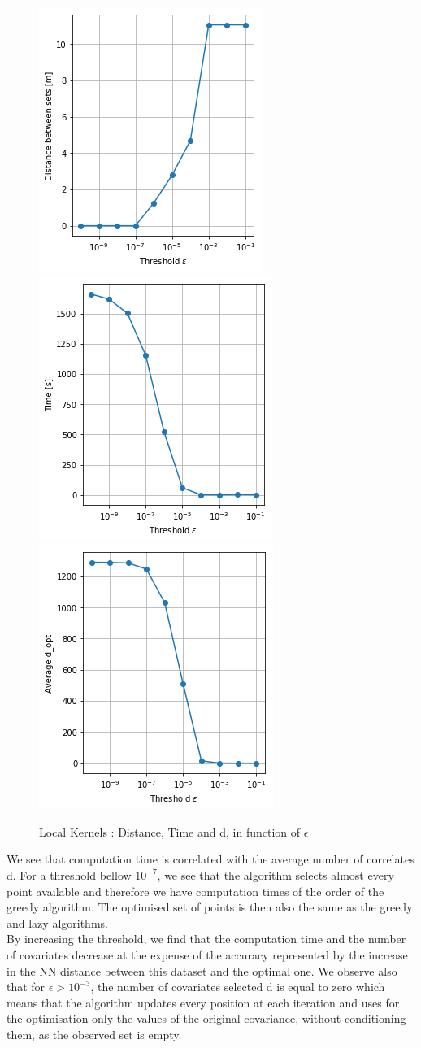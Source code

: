 \begin{figure}[h]
\centering
\includegraphics[height=0.33\linewidth]{figures/CompAlg/3rd/non_centered_60.35.0/comp_dist}
~
\includegraphics[height=0.33\linewidth]{figures/CompAlg/3rd/non_centered_60.35.0/comp_Time}
~
\includegraphics[height=0.33\linewidth]{figures/CompAlg/3rd/non_centered_60.35.0/comp_d_opt}
\caption{Local Kernels : Distance, Time and d, in function of $\epsilon$}
\label{fig:comp:results}
\end{figure}

We see that computation time is correlated with the average number of correlates d. For a threshold bellow $10^{-7}$, we see that the algorithm selects almost every point available and therefore we have computation times of the order of the greedy algorithm. The optimised set of points is then also the same as the greedy and lazy algorithms.\\

By increasing the threshold, we find that the computation time and the number of covariates decrease at the expense of the accuracy represented by the increase in the NN distance between this dataset and the optimal one. We observe also that for $\epsilon > 10^{-3}$, the number of covariates selected d is equal to zero which means that the algorithm updates every position at each iteration and uses for the optimisation only the values of the original covariance, without conditioning them, as the observed set is empty.  \\

